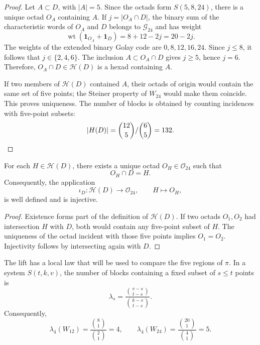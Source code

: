 \begin{proof}
Let \(A\subset D\), with \(|A|=5\). Since the octads form
\(S(5,8,24)\), there is a unique octad \(O_A\) containing \(A\). If
\(j=|O_A\cap D|\), the binary sum of the characteristic words of
\(O_A\) and \(D\) belongs to \(\mathcal G_{24}\) and has weight
\[
 \operatorname{wt}(\mathbf1_{O_A}+\mathbf1_D)=8+12-2j=20-2j.
\]
The weights of the extended binary Golay code are
\(0,8,12,16,24\). Since \(j\leq8\), it follows that
\(j\in\{2,4,6\}\). The inclusion \(A\subset O_A\cap D\) gives \(j\geq5\),
hence \(j=6\). Therefore, \(O_A\cap D\in\mathcal H(D)\) is a hexad containing
\(A\).

If two members of \(\mathcal H(D)\) contained \(A\), their octads of
origin would contain the same set of five points; the Steiner property of
\(W_{24}\) would make them coincide. This proves uniqueness. The number
of blocks is obtained by counting incidences with five-point subsets:
\[
 |\mathcal H(D)|
 =\frac{\binom{12}{5}}{\binom65}=132.\qedhere
\]
\end{proof}

\begin{theorem}
\label{p12-83-c17-s1:thm:elevacion-unica-hexada}
For each \(H\in\mathcal H(D)\), there exists a unique octad
\(O_H\in\mathcal O_{24}\) such that
\[
 O_H\cap D=H.
\]
Consequently, the application
\[
 \iota_D:\mathcal H(D)\longrightarrow\mathcal O_{24},
 \qquad H\longmapsto O_H,
\]
is well defined and is injective.
\end{theorem}

\begin{proof}
Existence forms part of the definition of \(\mathcal H(D)\). If two
octads \(O_1,O_2\) had intersection \(H\) with \(D\), both
would contain any five-point subset of \(H\). The uniqueness of
the octad incident with those five points implies \(O_1=O_2\).
Injectivity follows by intersecting again with \(D\).
\end{proof}

The lift has a local law that will be used to compare the five
regions of \(\pi\). In a system \(S(t,k,v)\), the number of blocks
containing a fixed subset of \(s\leq t\) points is
\[
 \lambda_s=\frac{\binom{v-s}{t-s}}{\binom{k-s}{t-s}}.
\]
Consequently,
\begin{equation}
 \lambda_4(W_{12})
 =\frac{\binom81}{\binom21}=4,
 \qquad
 \lambda_4(W_{24})
 =\frac{\binom{20}1}{\binom41}=5.
 \label{p12-83-c17-s1:eq:lambda4-w12-w24}
\end{equation}

